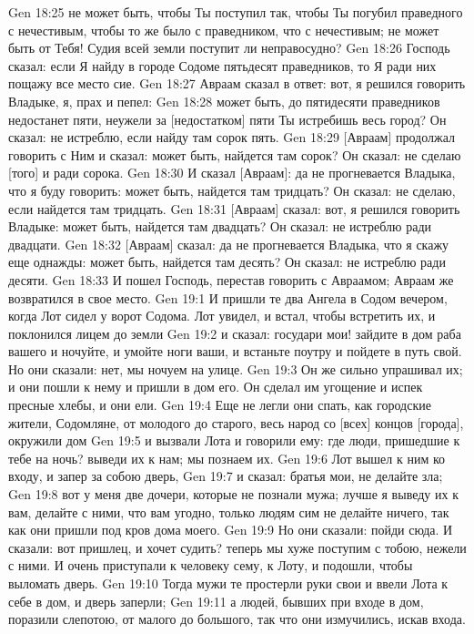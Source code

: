 Gen 18:25  не может быть, чтобы Ты поступил так, чтобы Ты погубил праведного с нечестивым, чтобы то же было с праведником, что с нечестивым; не может быть от Тебя! Судия всей земли поступит ли неправосудно?
Gen 18:26  Господь сказал: если Я найду в городе Содоме пятьдесят праведников, то Я ради них пощажу все место сие.
Gen 18:27  Авраам сказал в ответ: вот, я решился говорить Владыке, я, прах и пепел:
Gen 18:28  может быть, до пятидесяти праведников недостанет пяти, неужели за [недостатком] пяти Ты истребишь весь город? Он сказал: не истреблю, если найду там сорок пять.
Gen 18:29  [Авраам] продолжал говорить с Ним и сказал: может быть, найдется там сорок? Он сказал: не сделаю [того] и ради сорока.
Gen 18:30  И сказал [Авраам]: да не прогневается Владыка, что я буду говорить: может быть, найдется там тридцать? Он сказал: не сделаю, если найдется там тридцать.
Gen 18:31  [Авраам] сказал: вот, я решился говорить Владыке: может быть, найдется там двадцать? Он сказал: не истреблю ради двадцати.
Gen 18:32  [Авраам] сказал: да не прогневается Владыка, что я скажу еще однажды: может быть, найдется там десять? Он сказал: не истреблю ради десяти.
Gen 18:33  И пошел Господь, перестав говорить с Авраамом; Авраам же возвратился в свое место.
Gen 19:1  И пришли те два Ангела в Содом вечером, когда Лот сидел у ворот Содома. Лот увидел, и встал, чтобы встретить их, и поклонился лицем до земли
Gen 19:2  и сказал: государи мои! зайдите в дом раба вашего и ночуйте, и умойте ноги ваши, и встаньте поутру и пойдете в путь свой. Но они сказали: нет, мы ночуем на улице.
Gen 19:3  Он же сильно упрашивал их; и они пошли к нему и пришли в дом его. Он сделал им угощение и испек пресные хлебы, и они ели.
Gen 19:4  Еще не легли они спать, как городские жители, Содомляне, от молодого до старого, весь народ со [всех] концов [города], окружили дом
Gen 19:5  и вызвали Лота и говорили ему: где люди, пришедшие к тебе на ночь? выведи их к нам; мы познаем их.
Gen 19:6  Лот вышел к ним ко входу, и запер за собою дверь,
Gen 19:7  и сказал: братья мои, не делайте зла;
Gen 19:8  вот у меня две дочери, которые не познали мужа; лучше я выведу их к вам, делайте с ними, что вам угодно, только людям сим не делайте ничего, так как они пришли под кров дома моего.
Gen 19:9  Но они сказали: пойди сюда. И сказали: вот пришлец, и хочет судить? теперь мы хуже поступим с тобою, нежели с ними. И очень приступали к человеку сему, к Лоту, и подошли, чтобы выломать дверь.
Gen 19:10  Тогда мужи те простерли руки свои и ввели Лота к себе в дом, и дверь заперли;
Gen 19:11  а людей, бывших при входе в дом, поразили слепотою, от малого до большого, так что они измучились, искав входа.
